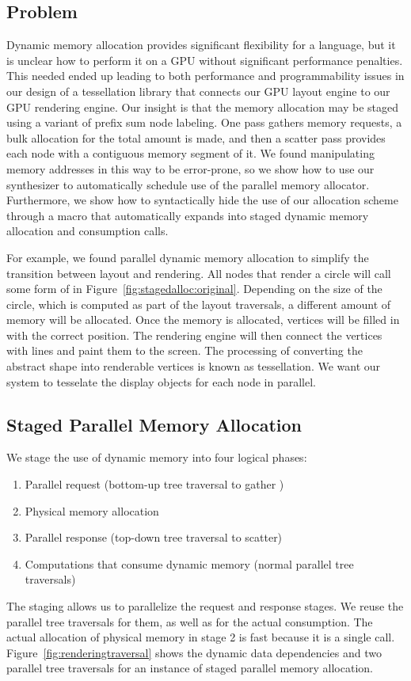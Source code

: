 \subsection{Problem}
Dynamic memory allocation provides significant flexibility for a language, but it is unclear how to perform it on a GPU without significant performance penalties. This needed ended up leading to both performance and programmability issues in our design of a tessellation library that connects our GPU layout engine to our GPU rendering engine. Our insight is that the memory allocation may be staged using a variant of prefix sum node labeling. One pass gathers  memory requests, a bulk allocation for the total amount is made, and then a scatter pass provides each node with a contiguous memory segment of it. We found manipulating memory addresses in this way to be error-prone, so we show how to use our synthesizer to automatically schedule use of the parallel memory allocator. Furthermore, we show how to syntactically hide the use of our allocation scheme through a macro that automatically expands into staged dynamic memory allocation and consumption calls.

For example, we found parallel dynamic memory allocation to simplify the transition between layout and rendering. All nodes that render a circle will call some form of  in Figure~\ref{fig:stagedalloc:original}. Depending on the size of the circle, which is computed as part of the layout traversals, a different amount of memory will be allocated. Once the memory is allocated, vertices will be filled in with the correct position. The rendering engine will then connect the vertices with lines and paint them to the screen. The processing of converting the abstract shape into renderable vertices is known as tessellation. We want our system to tesselate the display objects for each node in parallel.




\subsection{Staged Parallel Memory Allocation}
We stage the use of dynamic memory into four logical phases: 
\begin{enumerate}
\item Parallel request (bottom-up tree traversal to gather )
\item Physical memory allocation
\item Parallel response (top-down tree traversal to scatter)
\item Computations that consume dynamic memory (normal parallel tree traversals)
\end{enumerate}
 The staging allows us to parallelize the request and response stages. We reuse the parallel tree traversals for them, as well as for the actual consumption. The actual allocation of physical memory in stage 2 is fast because it is a single call. Figure~\ref{fig:renderingtraversal} shows the dynamic data dependencies and two parallel tree traversals for an instance of staged parallel memory allocation.


